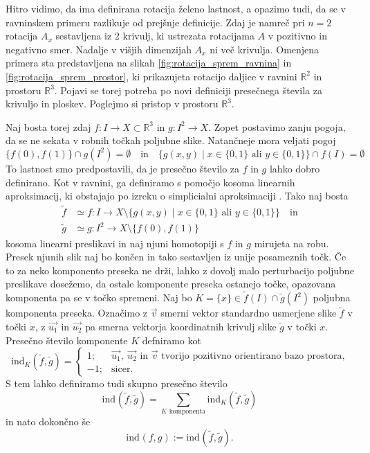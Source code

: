 \documentclass[mat1]{fmfdelo}
\newcommand{\R}{\mathbb R}
\newcommand{\ind}[3][]{\text{ind}_{#1}(#2, #3)}
\begin{document}
Hitro vidimo, da ima definirana rotacija želeno lastnost, a opazimo tudi, da se v ravninskem primeru razlikuje od prejšnje definicije. Zdaj je namreč pri $n=2$ rotacija $A_x$ sestavljena iz 2 krivulj, ki ustrezata rotacijama $A$ v pozitivno in negativno smer. Nadalje v višjih dimenzijah $A_x$ ni več krivulja. Omenjena primera sta predstavljena na slikah \ref{fig:rotacija_sprem_ravnina} in \ref{fig:rotacija_sprem_prostor}, ki prikazujeta rotacijo daljice v ravnini $\R^2$ in prostoru $\R^3$. Pojavi se torej potreba po novi definiciji presečnega števila za krivuljo in ploskev. Poglejmo si pristop v prostoru $\R^3$.

Naj bosta torej zdaj $f \colon I \to X \subset \R^3$ in $g \colon I^2 \to X$. Zopet postavimo zanju pogoja, da se ne sekata v robnih točkah poljubne slike. Natančneje mora veljati  pogoj
\begin{equation}\label{eq:razl_rob_prostor}
\{f(0), f(1)\} \cap g(I^2) = \emptyset \quad \text{in} \quad \{g(x, y) \mid x \in \{0, 1\} \text{ ali } y \in \{0, 1\} \} \cap f(I) = \emptyset
\end{equation}
To lastnost smo predpostavili, da je presečno število za $f$ in $g$ lahko dobro definirano. Kot v ravnini, ga definiramo s pomočjo kosoma linearnih aproksimacij, ki obstajajo po izreku o simplicialni aproksimaciji \cite{hatcher_alg_top}. Tako naj bosta 
\begin{align*}
\widetilde{f} &\simeq f \colon I \to X \setminus \{g(x, y) \mid x \in \{0, 1\} \text{ ali } y \in \{0, 1\} \} \quad \text{in}\\ 
\widetilde{g} &\simeq g\colon I^2 \to X \setminus \{f(0), f(1)\}
\end{align*}
kosoma linearni preslikavi in naj njuni homotopiji s $f$ in $g$ mirujeta na robu. Presek njunih slik naj bo končen in tako sestavljen iz unije posameznih točk. Če to za neko komponento preseka ne drži, lahko z dovolj malo perturbacijo poljubne preslikave dosežemo, da ostale komponente preseka ostanejo točke, opazovana komponenta pa se v točko spremeni. Naj bo $K = \{x\} \in \widetilde{f}(I) \cap \widetilde{g}(I^2)$ poljubna komponenta preseka. Označimo z $\overrightarrow{v}$ smerni vektor standardno usmerjene slike $\widetilde{f}$ v točki $x$, z $\overrightarrow{u_1}$ in $\overrightarrow{u_2}$ pa smerna vektorja koordinatnih krivulj slike $\widetilde{g}$ v točki $x$. Presečno število komponente $K$ defniramo kot
\begin{equation*}
\ind[K]{\widetilde{f}}{\widetilde{g}} = \begin{cases}
1; &\overrightarrow{u_1},\ \overrightarrow{u_2} \text{ in } \overrightarrow{v} \text{ tvorijo pozitivno orientirano bazo prostora,}\\
-1; &\text{sicer}.
\end{cases}
\end{equation*}
S tem lahko definiramo tudi skupno presečno število \[ \ind{\widetilde{f}}{\widetilde{g}} = \sum_{K \text{ komponenta}} \ind[K]{\widetilde{f}}{\widetilde{g}} \] in nato dokončno še \[ \ind{f}{g} := \ind{\widetilde{f}}{\widetilde{g}}. \]
\end{document}
